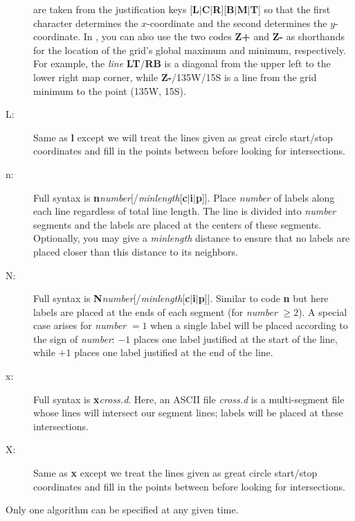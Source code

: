 \begin{description}
are taken from the  justification keys [\textbf{L$|$C$|$R}][\textbf{B$|$M$|$T}] so that the first
character determines the $x$-coordinate and the second determines the $y$-coordinate.  In ,
you can also use the two codes \textbf{Z+} and \textbf{Z-} as shorthands for the location of the grid's global
maximum and minimum, respectively.  For example, the \emph{line} \textbf{LT}/\textbf{RB} is a diagonal from the
upper left to the lower right map corner, while \textbf{Z-}/135W/15S is a line from the grid minimum to the point
(135\DS W, 15\DS S).
\item [L:] Same as \textbf{l} except we will treat the lines given as great circle start/stop coordinates and fill in
the points between before looking for intersections.
\item [n:] Full syntax is \textbf{n}\emph{number}[/\emph{minlength}[\textbf{c$|$i$|$p}]].  Place
\emph{number} of labels along each line regardless of total line length.  The line is divided into \emph{number}
segments and the labels are placed at the centers of these segments.  Optionally, you may give a \emph{minlength}
distance to ensure that no labels are placed closer than this distance to its neighbors.
\item [N:] Full syntax is \textbf{N}\emph{number}[/\emph{minlength}[\textbf{c$|$i$|$p}]].  Similar to
code \textbf{n} but here labels are placed at the ends of each segment (for \emph{number} $\geq 2$).  A special
case arises for \emph{number} $= 1$ when a single label will be placed according to the sign of \emph{number}:
$-1$ places one label justified at the start of the line, while $+1$ places one label justified at the end of the line.
\item [x:] Full syntax is \textbf{x}\emph{cross.d}.  Here, an ASCII file \emph{cross.d} is
a multi-segment file whose lines will intersect our segment lines; labels will be placed at these intersections.
\item [X:] Same as \textbf{x} except we treat the lines given as great circle start/stop coordinates and fill in the
points between before looking for intersections.
\end{description}
Only one algorithm can be specified at any given time.

